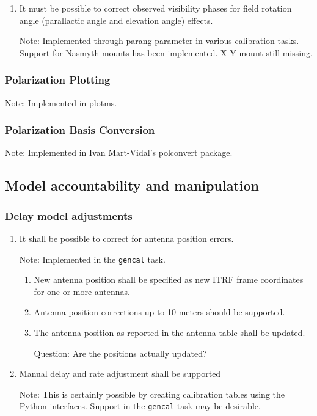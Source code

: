 \documentclass[11pt,a4paper]{article}
\begin{document}
\begin{enumerate}[subsubseclist]

\item It must be possible to correct observed visibility phases for
  field rotation angle (parallactic angle and elevation angle)
  effects.

  Note: Implemented through parang parameter in various calibration
  tasks.  Support for Nasmyth mounts has been implemented.  X-Y mount
  still missing.

\end{enumerate}

\subsubsection{Polarization Plotting}

Note: Implemented in plotms.

\subsubsection{Polarization Basis Conversion}

Note: Implemented in Ivan Mart-Vidal's polconvert package.


\subsection{Model accountability and manipulation}

\subsubsection{Delay model adjustments}

\begin{enumerate}[subsubseclist]

\item It shall be possible to correct for antenna position errors.

  Note: Implemented in the \texttt{gencal} task.

  \begin{enumerate}[subsubsecsublist]

  \item New antenna position shall be specified as new ITRF frame
    coordinates for one or more antennas.

  \item Antenna position corrections up to 10 meters should be supported.

  \item The antenna position as reported in the antenna table shall
    be updated.

    Question: Are the positions actually updated?

  \end{enumerate}

\item Manual delay and rate adjustment shall be supported

  Note: This is certainly possible by creating calibration tables
  using the Python interfaces.  Support in the \texttt{gencal} task
  may be desirable.

\end{enumerate}
\end{document}
